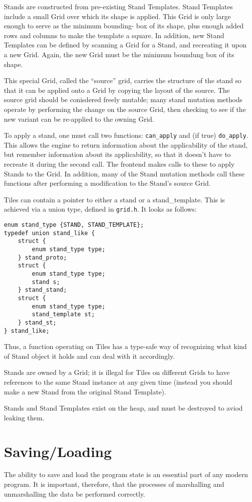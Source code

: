 \documentclass{report}
\begin{document}
Stands are constructed from pre-existing Stand Templates. Stand
Templates include a small Grid over which its shape is applied. This
Grid is only large enough to serve as the minimum bounding-
box of its shape, plus enough added rows and columns to make the template
a square. In addition, new Stand Templates can be defined by
scanning a Grid for a Stand, and recreating it upon a new Grid. Again,
the new Grid must be the minimum boundung box of its shape.

This special Grid, called the ``source'' grid, carries the structure of the
stand so that it can be applied onto a Grid by copying the layout of the source.
The source grid should be conisdered freely mutable; many stand mutation
methods operate by performing the change on the source Grid, then checking
to see if the new variant can be re-applied to the owning Grid.

To apply a stand, one must call two functions: \texttt{can_apply} and
(if true) \texttt{do_apply}. This allows the engine to return information
about the applicability of the stand, but remember information about its
applicability, so that it doesn't have to recreate it during the second call.
The frontend makes calls to these to apply Stands to the Grid. In addition,
many of the Stand mutation methods call these functions after performing a
modification to the Stand's source Grid.

Tiles can contain a pointer to either a stand or a stand_template. This is
achieved via a union type, defined in \texttt{grid.h}. It looks as follows:
\begin{verbatim}
enum stand_type {STAND, STAND_TEMPLATE};
typedef union stand_like {
	struct {
		enum stand_type type;
	} stand_proto;
	struct {
		enum stand_type type;
		stand s;
	} stand_stand;
	struct {
		enum stand_type type;
		stand_template st;
	} stand_st;
} stand_like;
\end{verbatim}
Thus, a function operating on Tiles has a type-safe way of recognizing what
kind of Stand object it holds and can deal with it accordingly. 

Stands are owned by a Grid; it is illegal for Tiles on different Grids to
have references to the same Stand instance at any given time (instead you
should make a new Stand from the original Stand Template).

Stands and Stand Templates exist on the heap, and must be destroyed
to aviod leaking them.

\section{Saving/Loading}
The ability to save and load the program state is an essential part of
any modern program. It is important, therefore, that the processes of
marshalling and unmarshalling the data be performed correctly.
\end{document}
